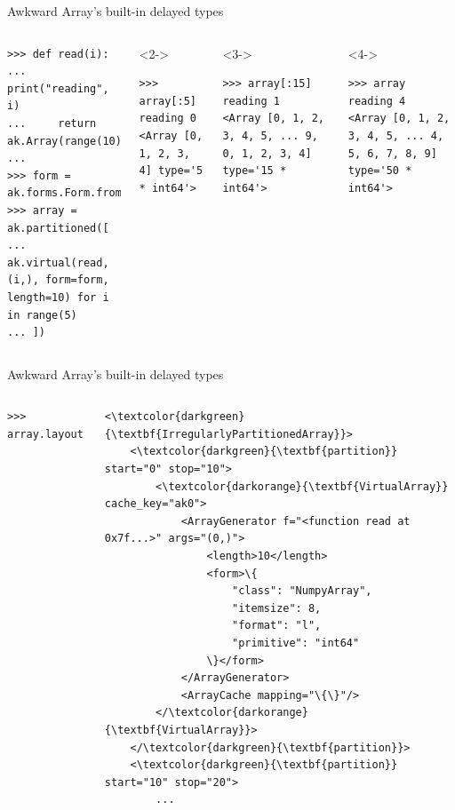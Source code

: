 \documentclass[aspectratio=169]{beamer}
\begin{document}
\begin{frame}[fragile]{Awkward Array's built-in delayed types}
\small
\begin{columns}
\begin{verbatim}
>>> def read(i):
...     print("reading", i)
...     return ak.Array(range(10))
... 
>>> form = ak.forms.Form.from_numpy(np.dtype(np.int64))
>>> array = ak.partitioned([
...     ak.virtual(read, (i,), form=form, length=10) for i in range(5)
... ])
\end{verbatim}
\vspace{-0.3 cm}
\begin{uncoverenv}<2->
\begin{verbatim}
>>> array[:5]
reading 0
<Array [0, 1, 2, 3, 4] type='5 * int64'>
\end{verbatim}
\end{uncoverenv}
\begin{uncoverenv}<3->
\vspace{-0.3 cm}
\begin{verbatim}
>>> array[:15]
reading 1
<Array [0, 1, 2, 3, 4, 5, ... 9, 0, 1, 2, 3, 4] type='15 * int64'>
\end{verbatim}
\end{uncoverenv}
\vspace{-0.3 cm}
\begin{uncoverenv}<4->
\begin{verbatim}
>>> array
reading 4
<Array [0, 1, 2, 3, 4, 5, ... 4, 5, 6, 7, 8, 9] type='50 * int64'>
\end{verbatim}
\end{uncoverenv}
\end{columns}
\end{frame}

\begin{frame}[fragile]{Awkward Array's built-in delayed types}
\small
\begin{columns}
\begin{verbatim}
>>> array.layout
\end{verbatim}
\vspace{-0.4 cm}
\begin{Verbatim}[commandchars=\\\{\}]
<\textcolor{darkgreen}{\textbf{IrregularlyPartitionedArray}}>
    <\textcolor{darkgreen}{\textbf{partition}} start="0" stop="10">
        <\textcolor{darkorange}{\textbf{VirtualArray}} cache_key="ak0">
            <ArrayGenerator f="<function read at 0x7f...>" args="(0,)">
                <length>10</length>
                <form>\{
                    "class": "NumpyArray",
                    "itemsize": 8,
                    "format": "l",
                    "primitive": "int64"
                \}</form>
            </ArrayGenerator>
            <ArrayCache mapping="\{\}"/>
        </\textcolor{darkorange}{\textbf{VirtualArray}}>
    </\textcolor{darkgreen}{\textbf{partition}}>
    <\textcolor{darkgreen}{\textbf{partition}} start="10" stop="20">
        ...
\end{Verbatim}
\end{columns}
\end{frame}
\end{document}
